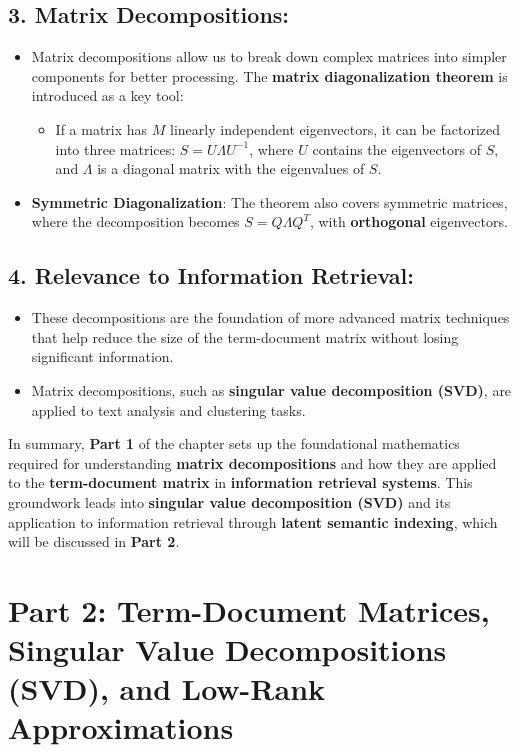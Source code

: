 \documentclass{article}
\begin{document}
\subsection*{3. Matrix Decompositions:}
\begin{itemize}
    \item Matrix decompositions allow us to break down complex matrices into simpler components for better processing. The \textbf{matrix diagonalization theorem} is introduced as a key tool:
    \begin{itemize}
        \item If a matrix has \( M \) linearly independent eigenvectors, it can be factorized into three matrices: \( S = U \Lambda U^{-1} \), where \( U \) contains the eigenvectors of \( S \), and \( \Lambda \) is a diagonal matrix with the eigenvalues of \( S \).
    \end{itemize}
    \item \textbf{Symmetric Diagonalization}: The theorem also covers symmetric matrices, where the decomposition becomes \( S = Q \Lambda Q^T \), with \textbf{orthogonal} eigenvectors.
\end{itemize}

\subsection*{4. Relevance to Information Retrieval:}
\begin{itemize}
    \item These decompositions are the foundation of more advanced matrix techniques that help reduce the size of the term-document matrix without losing significant information.
    \item Matrix decompositions, such as \textbf{singular value decomposition (SVD)}, are applied to text analysis and clustering tasks.
\end{itemize}

In summary, \textbf{Part 1} of the chapter sets up the foundational mathematics required for understanding \textbf{matrix decompositions} and how they are applied to the \textbf{term-document matrix} in \textbf{information retrieval systems}. This groundwork leads into \textbf{singular value decomposition (SVD)} and its application to information retrieval through \textbf{latent semantic indexing}, which will be discussed in \textbf{Part 2}.

\section*{Part 2: Term-Document Matrices, Singular Value Decompositions (SVD), and Low-Rank Approximations}
\end{document}

